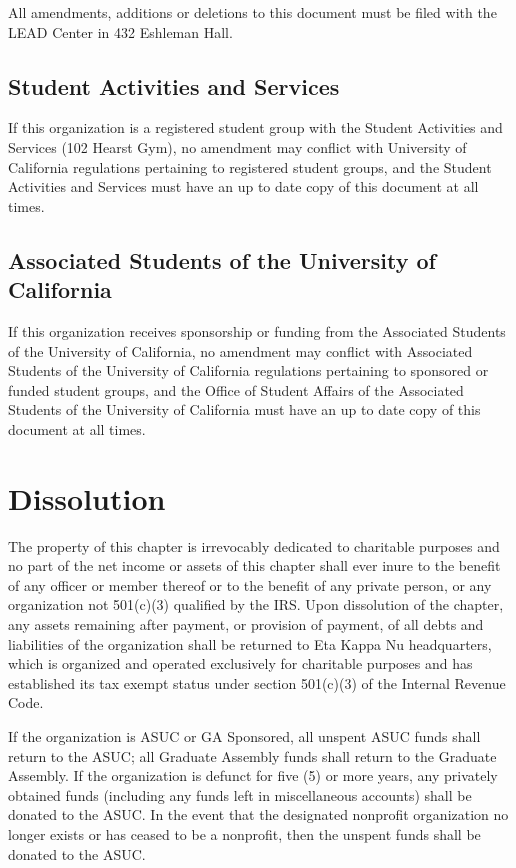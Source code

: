 \documentclass[11pt]{article}
\begin{document}
All amendments, additions or deletions to this document must be filed with the LEAD Center in 432 Eshleman Hall.

\subsection{Student Activities and Services}
\label{sec:orgf6a72f1}

If this organization is a registered student group with the Student Activities and Services (102 Hearst Gym), no amendment may conflict with University of California regulations pertaining to registered student groups, and the Student Activities and Services must have an up to date copy of this document at all times.

\subsection{Associated Students of the University of California}
\label{sec:org77f64c2}

If this organization receives sponsorship or funding from the Associated Students of the University of California, no amendment may conflict with Associated Students of the University of California regulations pertaining to sponsored or funded student groups, and the Office of Student Affairs of the Associated Students of the University of California must have an up to date copy of this document at all times.
\section{Dissolution}
\label{sec:org493b832}

The property of this chapter is irrevocably dedicated to charitable purposes and no part of the net income or assets of this chapter shall ever inure to the benefit of any officer or member thereof or to the benefit of any private person, or any organization not 501(c)(3) qualified by the IRS.
Upon dissolution of the chapter, any assets remaining after payment, or provision of payment, of all debts and liabilities of the organization shall be returned to Eta Kappa Nu headquarters, which is organized and operated exclusively for charitable purposes and has established its tax exempt status under section 501(c)(3) of the Internal Revenue Code.

If the organization is ASUC or GA Sponsored, all unspent ASUC funds shall return to the ASUC; all Graduate Assembly funds shall return to the Graduate Assembly.
If the organization is defunct for five (5) or more years, any privately obtained funds (including any funds left in miscellaneous accounts) shall be donated to the ASUC.
In the event that the designated nonprofit organization no longer exists or has ceased to be a nonprofit, then the unspent funds shall be donated to the ASUC.
\end{document}
